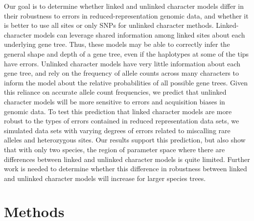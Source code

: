 


Our goal is to determine whether linked and unlinked character models
differ in their robustness to errors in reduced-representation genomic data,
and whether it is better to use all sites or only SNPs for unlinked character
methods.
Linked-character models can leverage shared information among linked sites
about each underlying gene tree.
Thus, these models may be able to correctly infer the general shape and depth
of a gene tree, even if the haplotypes at some of the tips have errors.
Unlinked character models have very little information about each gene tree,
and rely on the frequency of allele counts across many characters to inform the
model about the relative probabilities of all possible gene trees.
Given this reliance on accurate allele count frequencies, we predict that
unlinked character models will be more sensitive to errors and acquisition
biases in genomic data.
To test this prediction that linked character models are more robust to the
types of errors contained in reduced representation data sets,
we simulated data sets with varying degrees of errors related to miscalling
rare alleles and heterozygous sites.
Our results support this prediction, but also show that with only two species,
the region of parameter space where there are differences between linked and
unlinked character models is quite limited.
Further work is needed to determine whether this difference in robustness
between linked and unlinked character models will increase for larger species
trees.


\section{Methods}

